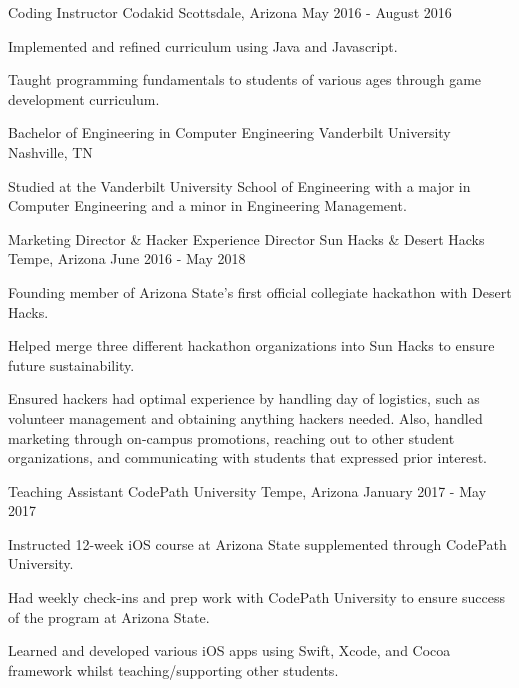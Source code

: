 \documentclass[
    changecolor={35, 47, 63},
]{resume}
\begin{document}
\cventry
  {Coding Instructor}
  {Codakid}
  {Scottsdale, Arizona}
  {May 2016 - August 2016}
  {
    \begin{cvitems}
      \item {Implemented and refined curriculum using Java and Javascript.}
      \item {Taught programming fundamentals to students of various ages through game development curriculum.}
    \end{cvitems}
  }

\cventry
  {Bachelor of Engineering in Computer Engineering}
  {Vanderbilt University}
  {Nashville, TN}
  {}
  {
    \begin{cvitems}
      \item {Studied at the Vanderbilt University School of Engineering with a major in Computer Engineering and a minor in Engineering Management.}
    \end{cvitems}
  }

\cventry
  {Marketing Director \& Hacker Experience Director}
  {Sun Hacks \& Desert Hacks}
  {Tempe, Arizona}
  {June 2016 - May 2018}
  {
    \begin{cvitems}
      \item {Founding member of Arizona State's first official collegiate hackathon with Desert Hacks.}
      \item {Helped merge three different hackathon organizations into Sun Hacks to ensure future sustainability.}
      \item {Ensured hackers had optimal experience by handling day of logistics, such as volunteer management and obtaining anything hackers needed. Also, handled marketing through on-campus promotions, reaching out to other student organizations, and communicating with students that expressed prior interest.}
    \end{cvitems}
  }
\cventry
  {Teaching Assistant}
  {CodePath University}
  {Tempe, Arizona}
  {January 2017 - May 2017}
  {
    \begin{cvitems}
      \item {Instructed 12-week iOS course at Arizona State supplemented through CodePath University.}
      \item {Had weekly check-ins and prep work with CodePath University to ensure success of the program at Arizona State.}
      \item {Learned and developed various iOS apps using Swift, Xcode, and Cocoa framework whilst teaching/supporting other students.}
    \end{cvitems}
  }

  \begin{cvskills}
  \end{cvskills}
\end{document}
